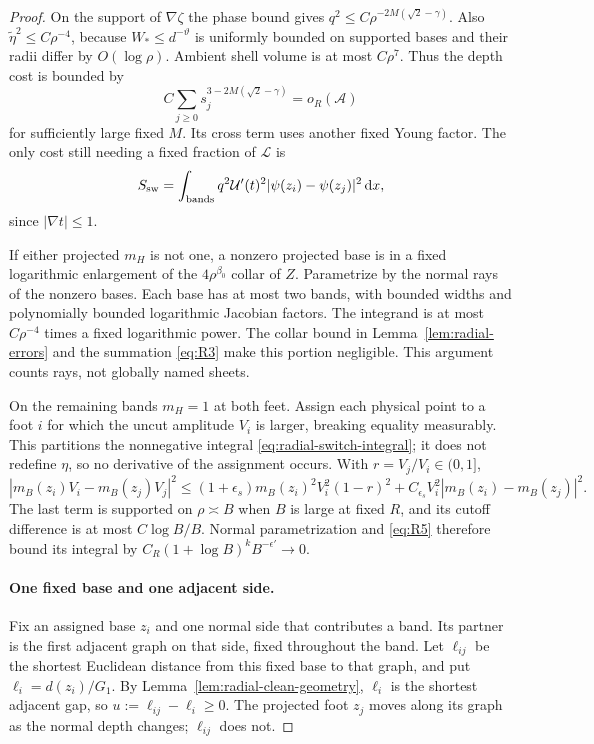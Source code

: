 \begin{proof}
On the support of $\nabla\zeta$ the phase bound gives
$q^2\le C\rho^{-2M(\sqrt2-\gamma)}$. Also
$\widetilde\eta^2\le C\rho^{-4}$, because $W_*\le d^{-\vartheta}$ is uniformly bounded on supported bases and their radii differ by $O(\log\rho)$. Ambient shell volume is at most $C\rho^7$. Thus the depth cost is bounded by
\[
 C\sum_{j\ge0}s_j^{3-2M(\sqrt2-\gamma)}=o_R(\mathcal A)
\]
for sufficiently large fixed $M$. Its cross term uses another fixed Young factor. The only cost still needing a fixed fraction of $\mathcal L$ is
\begin{equation}\label{eq:radial-switch-integral}
 S_{\rm sw}=\int_{\rm bands}q^2\mathcal U'(t)^2
                  |\psi(z_i)-\psi(z_j)|^2\,\mathrm d x,
\end{equation}
since $|\nabla t|\le1$.

If either projected $m_H$ is not one, a nonzero projected base is in a fixed logarithmic enlargement of the $4\rho^{\beta_0}$ collar of $Z$. Parametrize by the normal rays of the nonzero bases. Each base has at most two bands, with bounded widths and polynomially bounded logarithmic Jacobian factors. The integrand is at most $C\rho^{-4}$ times a fixed logarithmic power. The collar bound in Lemma~\ref{lem:radial-errors} and the summation \eqref{eq:R3} make this portion negligible. This argument counts rays, not globally named sheets.

On the remaining bands $m_H=1$ at both feet. Assign each physical point to a foot $i$ for which the uncut amplitude $V_i$ is larger, breaking equality measurably. This partitions the nonnegative integral \eqref{eq:radial-switch-integral}; it does not redefine $\eta$, so no derivative of the assignment occurs. With $r=V_j/V_i\in(0,1]$,
\begin{equation}\label{eq:radial-cutoff-split}
 |m_B(z_i)V_i-m_B(z_j)V_j|^2
 \le(1+\epsilon_s)m_B(z_i)^2V_i^2(1-r)^2
      +C_{\epsilon_s}V_i^2|m_B(z_i)-m_B(z_j)|^2.
\end{equation}
The last term is supported on $\rho\asymp B$ when $B$ is large at fixed $R$, and its cutoff difference is at most $C\log B/B$. Normal parametrization and \eqref{eq:R5} therefore bound its integral by
$C_R(1+\log B)^kB^{-\epsilon'}\to0$.

\paragraph{One fixed base and one adjacent side.}

Fix an assigned base $z_i$ and one normal side that contributes a band. Its partner is the first adjacent graph on that side, fixed throughout the band. Let $\ell_{ij}$ be the shortest Euclidean distance from this fixed base to that graph, and put $\ell_i=d(z_i)/G_1$. By Lemma~\ref{lem:radial-clean-geometry}, $\ell_i$ is the shortest adjacent gap, so
$u:=\ell_{ij}-\ell_i\ge0$. The projected foot $z_j$ moves along its graph as the normal depth changes; $\ell_{ij}$ does not.


\end{proof}
